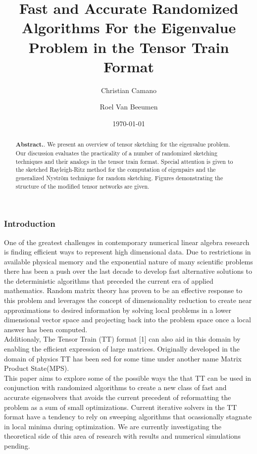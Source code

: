 \documentclass[%
 aip,12pt
 amsmath,amssymb,
 reprint,%
]{revtex4-1}
\begin{document}

\title[Fast and Accurate Randomized Algorithms For the Eigenvalue Problem in the Tensor Train Format]{Fast and Accurate Randomized Algorithms For the Eigenvalue Problem in the Tensor Train Format
}
\author{Christian Camano}
\author{Roel Van Beeumen}%
\date{\today}%

\begin{abstract}
\textbf{Abstract.}.
We present an overview of tensor sketching for the eigenvalue problem. Our discussion evaluates the practicality of a number of randomized sketching techniques and their analogs in the tensor train format. Special attention is given to the sketched Rayleigh-Ritz method for the computation of eigenpairs and the generalized Nyström technique for random sketching. Figures demonstrating the structure of the modified tensor networks are given.
\end{abstract}

\maketitle

\subsubsection{\label{sec:level3}Introduction}
One of the greatest challenges in contemporary numerical linear algebra research is finding efficient ways to represent high dimensional data. Due to restrictions in available physical memory and the exponential nature of many scientific problems there has been a push over the last decade to develop fast alternative solutions to the deterministic algorithms that preceded the current era of applied mathematics. Random matrix theory has proven to be an effective response to this problem and leverages the concept of dimensionality reduction to create near approximations to desired information by solving local problems in a lower dimensional vector space and projecting back into the problem space once a local answer has been computed.
\\
Additionaly, The Tensor Train (TT) format [1] can also aid in this domain by enabling the efficient expression of large matrices. Originally developed in the domain of physics TT has been sed for some time under another name Matrix Product State(MPS).
\\
This paper aims to explore some of the possible ways the that TT can be used in conjunction with randomized algorithms to create a new class of fast and accurate eigensolvers that avoids the current precedent of reformatting the problem as a sum of small optimizations. Current iterative solvers in the TT format have a tendency to rely on sweeping algorithms that ocassionally stagnate in local minima during optimization. We are currently investigating the theoretical side of this area of research with results and numerical simulations pending.
\end{document}
